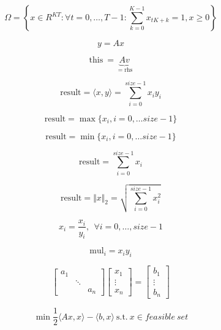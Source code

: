 \documentclass{article}
\begin{document}
\[ \Omega = \left\lbrace x \in R^{KT}: \forall t = 0,\dots,T-1: \sum\limits_{k=0}^{K-1} x_{tK+k} = 1, x \geq 0 \right\rbrace \]
\pagebreak

\[ y = Ax \]
\pagebreak

\[ \mathrm{this}~ = \underbrace{Av}_{= \mathrm{rhs}} \]
\pagebreak

\[\mathrm{result} = \langle x,y \rangle = \sum\limits_{i = 0}^{size-1} x_i y_i\]
\pagebreak

\[\mathrm{result} = \max \lbrace x_i, i = 0, \dots size-1 \rbrace\]
\pagebreak

\[\mathrm{result} = \min \lbrace x_i, i = 0, \dots size-1 \rbrace\]
\pagebreak

\[\mathrm{result} = \sum\limits_{i = 0}^{size-1} x_i \]
\pagebreak

\[\mathrm{result} = \Vert x \Vert_2 = \sqrt{\sum\limits_{i = 0}^{size-1} x_i^2} \]
\pagebreak

\[ x_i = \frac{x_i}{y_i}, ~~\forall i = 0, \dots, size-1 \]
\pagebreak

\[\mathrm{mul}_i = x_i y_i \]
\pagebreak

\[ \left[ \begin{array}{ccc} a_1 & & \\ & \ddots & \\ & & a_n \end{array} \right] \left[ \begin{array}{c} x_1 \\ \vdots \\ x_n \end{array} \right] = \left[ \begin{array}{c} b_1 \\ \vdots \\ b_n \end{array} \right] \]
\pagebreak

\[ \min \frac{1}{2} \langle Ax,x \rangle - \langle b,x \rangle ~\mathrm{s.t.}~ x \in feasible~set \]
\pagebreak
\end{document}
